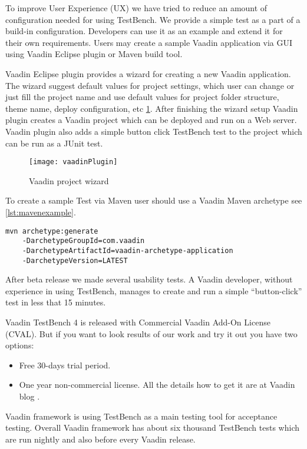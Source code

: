 To improve User Experience (UX) we have tried to reduce an amount of
configuration needed for using TestBench. We provide a simple test as a
part of a build-in configuration.
Developers can use it as an example and extend it for their own requirements. Users may create a sample
Vaadin application via GUI using Vaadin Eclipse plugin or Maven build tool.

Vaadin Eclipse plugin provides a wizard for creating a new Vaadin application.
The wizard suggest default values for project settings, which user can change or just fill
the project name and use default values for project folder structure, theme
name, deploy configuration, etc \ref{fig:vaadinPlugin}. After finishing the
wizard setup Vaadin plugin creates a Vaadin project which can be
deployed and run on a Web server. Vaadin plugin also adds a simple button click
TestBench test to the project which can be run as a JUnit test.
  \begin{figure}
  \centering
  \texttt{[image: vaadinPlugin]}
  \caption{Vaadin project wizard}
  \label{fig:vaadinPlugin}
  \end{figure}

To create a sample Test via Maven user should use a Vaadin Maven
archetype see \ref{lst:mavenexample}.
\lstset{style=console}
\begin{lstlisting}[caption=Create Vaadin sample application command.,label={lst:mavenexample}]
mvn archetype:generate 
	-DarchetypeGroupId=com.vaadin
	-DarchetypeArtifactId=vaadin-archetype-application
	-DarchetypeVersion=LATEST
\end{lstlisting}

After beta release we made several usability tests.
A Vaadin developer, without experience in using TestBench, manages to create and 
run a simple ``button-click'' test in less that 15 minutes. 

Vaadin TestBench 4 is released with Commercial Vaadin Add-On License 
(CVAL). But if you want to look results of our work and try it out you have two
options:
\begin{itemize}
  \item Free 30-days trial period.
  \item One year non-commercial license. All the details how to get it are at
  Vaadin blog \cite{vaadinBlog}.
\end{itemize}

Vaadin framework is using TestBench as a main testing tool for acceptance
testing. Overall Vaadin framework has about six thousand TestBench tests which
are run nightly and also before every Vaadin release.
